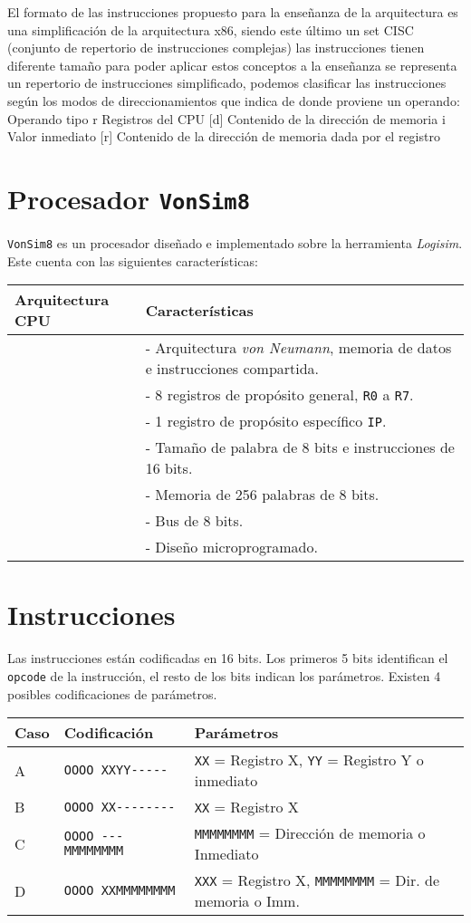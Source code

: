 \documentclass[12pt,twoside]{templates/unerthesis}
\begin{document}
El formato de las instrucciones propuesto para la enseñanza de la arquitectura es una simplificación de la arquitectura x86, siendo este último un set CISC (conjunto de repertorio de instrucciones complejas) las instrucciones tienen diferente tamaño para poder aplicar estos conceptos a la enseñanza se representa un repertorio de instrucciones simplificado, podemos clasificar las instrucciones según los modos de direccionamientos que indica de donde proviene un operando:
Operando tipo
r Registros del CPU
{[}d{]} Contenido de la dirección de memoria
i Valor inmediato
{[}r{]} Contenido de la dirección de memoria dada por el registro

\hypertarget{procesador-vonsim8}{%
\section{\texorpdfstring{Procesador \texttt{VonSim8}}{Procesador VonSim8}}\label{procesador-vonsim8}}

\texttt{VonSim8} es un procesador diseñado e implementado sobre la herramienta \emph{Logisim}.
Este cuenta con las siguientes características:

\begin{longtable}[]{@{}ll@{}}
\toprule
Arquitectura CPU & \textbf{Características}\tabularnewline
\midrule
\endhead
& - Arquitectura \emph{von Neumann}, memoria de datos e instrucciones compartida.\tabularnewline
& - 8 registros de propósito general, \texttt{R0} a \texttt{R7}.\tabularnewline
& - 1 registro de propósito específico \texttt{IP}.\tabularnewline
& - Tamaño de palabra de 8 bits e instrucciones de 16 bits.\tabularnewline
& - Memoria de 256 palabras de 8 bits.\tabularnewline
& - Bus de 8 bits.\tabularnewline
& - Diseño microprogramado.\tabularnewline
\bottomrule
\end{longtable}

\hypertarget{instrucciones}{%
\section{Instrucciones}\label{instrucciones}}

Las instrucciones están codificadas en 16 bits. Los primeros 5 bits identifican el \texttt{opcode} de la instrucción, el resto de los bits indican los parámetros. Existen 4 posibles codificaciones de parámetros.

\begin{longtable}[]{@{}lll@{}}
\toprule
Caso & Codificación & Parámetros\tabularnewline
\midrule
\endhead
A & \texttt{OOOO\ XXYY-\/-\/-\/-\/-} & \texttt{XX} = Registro X, \texttt{YY} = Registro Y o inmediato\tabularnewline
B & \texttt{OOOO\ XX-\/-\/-\/-\/-\/-\/-\/-} & \texttt{XX} = Registro X\tabularnewline
C & \texttt{OOOO\ -\/-\/-MMMMMMMM} & \texttt{MMMMMMMM} = Dirección de memoria o Inmediato\tabularnewline
D & \texttt{OOOO\ XXMMMMMMMM} & \texttt{XXX} = Registro X, \texttt{MMMMMMMM} = Dir. de memoria o Imm.\tabularnewline
\bottomrule
\end{longtable}
\end{document}
